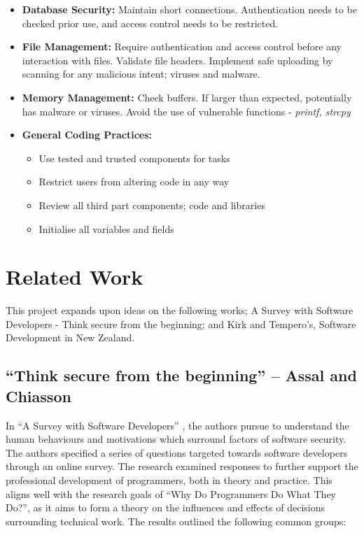 \begin{itemize}
\item \textbf{Database Security:} Maintain short connections. Authentication needs to be checked prior use, and access control needs to be restricted. 
\item \textbf{File Management:} Require authentication and access control before any interaction with files. Validate file headers. Implement safe uploading by scanning for any malicious intent; viruses and malware. 
\item \textbf{Memory Management:} Check buffers. If larger than expected, potentially has malware or viruses. Avoid the use of vulnerable functions - \textit{printf, strcpy}
\item \textbf{General Coding Practices:}
\begin{itemize}
\item Use tested and trusted components for tasks
\item Restrict users from altering code in any way
\item Review all third part components; code and libraries
\item Initialise all variables and fields
\end{itemize}
\end{itemize}

\section{Related Work}

This project expands upon ideas on the following works; A Survey with Software Developers - Think secure from the beginning; and Kirk and Tempero's, Software Development in New Zealand.

\subsection{“Think secure from the beginning” – Assal and Chiasson}

In “A Survey with Software Developers” \cite{summary1}, the authors pursue to understand the human behaviours and motivations which surround factors of software security. The authors specified a series of questions targeted towards software developers through an online survey. The research examined responses to further support the professional development of programmers, both in theory and practice. This aligns well with the research goals of “Why Do Programmers Do What They Do?”, as it aims to form a theory on the influences and effects of decisions surrounding technical work. 
\newline
\newline
The results outlined the following common groups:

